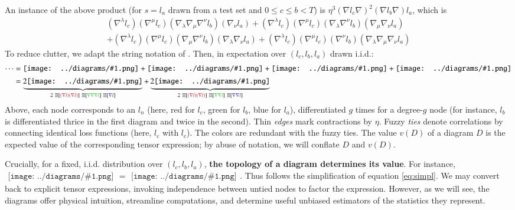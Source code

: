 \documentclass{article}
\newcommand{\expct}[1]{\mathbb{E}\left[#1\right]}
\newcommand{\sdia}[1]{\begin{gathered}\texttt{[image: ../diagrams/\#1.png]}\end{gathered}}
\begin{document}
    An instance of the above product (for $s=l_a$ drawn from a test set and
    $0\leq c\leq b<T$) is
    $\eta^3 (\nabla l_c \nabla)^2 (\nabla l_b \nabla) l_a$, which is
    {\small
    \begin{align*}
          (\nabla^\lambda l_c) (\nabla^\mu l_c) (\nabla_\lambda \nabla_\mu \nabla^\nu l_b) (\nabla_\nu l_a)   
        + (\nabla^\lambda l_c) (\nabla^\mu l_c) (\nabla_\lambda \nabla^\nu l_b) (\nabla_\mu \nabla_\nu l_a) \\
        + (\nabla^\lambda l_c) (\nabla^\mu l_c) (\nabla_\mu \nabla^\nu l_b) (\nabla_\lambda \nabla_\nu l_a)   
        + (\nabla^\lambda l_c) (\nabla^\mu l_c) (\nabla^\nu l_b) (\nabla_\lambda \nabla_\mu \nabla_\nu l_a)
    \end{align*}
    }
    To reduce clutter, we adapt the string notation of \citet{pe71}.  Then, in
    expectation over $(l_c, l_b, l_a)$ drawn i.i.d.:
    \begin{align}
        \cdots
        &= 
             \sdia{(01-2-3)(02-12-23)}
            +\sdia{(01-2-3)(02-13-23)}
            +\sdia{(01-2-3)(03-12-23)}
            +\sdia{(01-2-3)(03-13-23)} \\
            \label{eq:simpl}
        &=
            \underbrace{2\sdia{(01-2-3)(02-12-23)}}_{
                2~\expct{{\color{moor}(\nabla l)(\nabla l)}}~\expct{{\color{moog}\nabla\nabla\nabla l}}~\expct{{\color{moob} \nabla l}}
            }
            +
            \underbrace{2\sdia{(01-2-3)(02-13-23)}}_{
                2~\expct{{\color{moor}(\nabla l)(\nabla l)}}~\expct{{\color{moog}\nabla \nabla l}}~\expct{{\color{moob}\nabla \nabla l}}
            }
    \end{align}
    Above, each node corresponds to an $l_n$ (here, red for $l_c$, green
    for $l_b$, blue for $l_a$), differentiated $g$ times for a degree-$g$ node
    (for instance, $l_b$ is differentiated thrice in the first diagram and
    twice in the second).  Thin \emph{edges} mark contractions by $\eta$.
    Fuzzy \emph{ties} denote correlations by connecting identical loss
    functions (here, $l_c$ with $l_c$).  The colors are redundant with the
    fuzzy ties.  The value $v(D)$ of a diagram $D$ is the expected value of the
    corresponding tensor expression; by abuse of notation, we will conflate $D$
    and $v(D)$.
    
    Crucially, for a fixed, i.i.d.  distribution over $(l_c, l_b, l_a)$, {\bf
    the topology of a diagram determines its value}.  For instance,
    $\sdia{(01-2-3)(02-12-23)} = \sdia{(01-2-3)(03-13-23)}$.  Thus follows the
    simplification of equation \ref{eq:simpl}.  We may convert back to explicit
    tensor expressions, invoking independence between untied nodes to factor
    the expression.  However, as we will see, the diagrams offer physical
    intuition, streamline computations, and determine useful unbiased
    estimators of the statistics they represent.  
\end{document}
